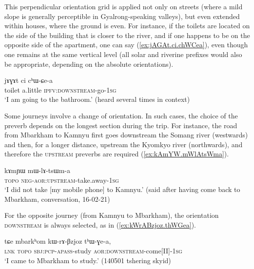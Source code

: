 This perpendicular orientation grid is applied not only on streets (where a mild slope is generally perceptible in Gyalrong-speaking valleys), but even extended within houses, where the ground is even. For instance, if the toilets are located on the side of the building that is closer to the river, and if one happens to be on the opposite side of the apartment, one can say (\ref{ex:jAGAt.ci.chWCea}), even though one remains at the same vertical level (all solar and riverine prefixes would also be appropriate, depending on the absolute orientations).

 \begin{exe}
\ex \label{ex:jAGAt.ci.chWCea}
\gll  jɤɣɤt ci cʰɯ-ɕe-a \\
toilet a.little \textsc{ipfv}:\textsc{downstream}-go-\textsc{1sg} \\
\glt `I am going to the bathroom.' (heard several times in context)
\end{exe}
 
Some journeys involve a change of orientation. In such cases, the choice of the preverb depends on the longest section during the trip. For instance, the road from Mbarkham to Kamnyu first goes downstream the Somang river (westwards) and then, for a longer distance, upstream the Kyomkyo river (northwards), and therefore the \textsc{upstream} preverbs are required (\ref{ex:kAmYW.mWlAtsWma}). 

 \begin{exe}
\ex \label{ex:kAmYW.mWlAtsWma}
\gll kɤmɲɯ mɯ-lɤ-tsɯm-a \\
\textsc{topo} \textsc{neg}-\textsc{aor}:\textsc{upstream}-take.away-\textsc{1sg} \\
\glt `I did not take  [my mobile phone] to Kamnyu.' (said after having come back to Mbarkham, conversation, 16-02-21)
\end{exe}

For the opposite journey (from Kamnyu to Mbarkham), the orientation \textsc{downstream} is always selected, as in (\ref{ex:kWrABzjoz.thWGea}).

 \begin{exe}
\ex \label{ex:kWrABzjoz.thWGea}
\gll tɕe mbarkʰom kɯ-rɤ-βzjoz tʰɯ-ɣe-a, \\
\textsc{lnk}  \textsc{topo} \textsc{sbj}:\textsc{pcp}-\textsc{apass}-study \textsc{aor}:\textsc{downstream}-come[II]-\textsc{1sg} \\
\glt `I came to Mbarkham to study.' (140501 tshering skyid) 
\end{exe}
 
